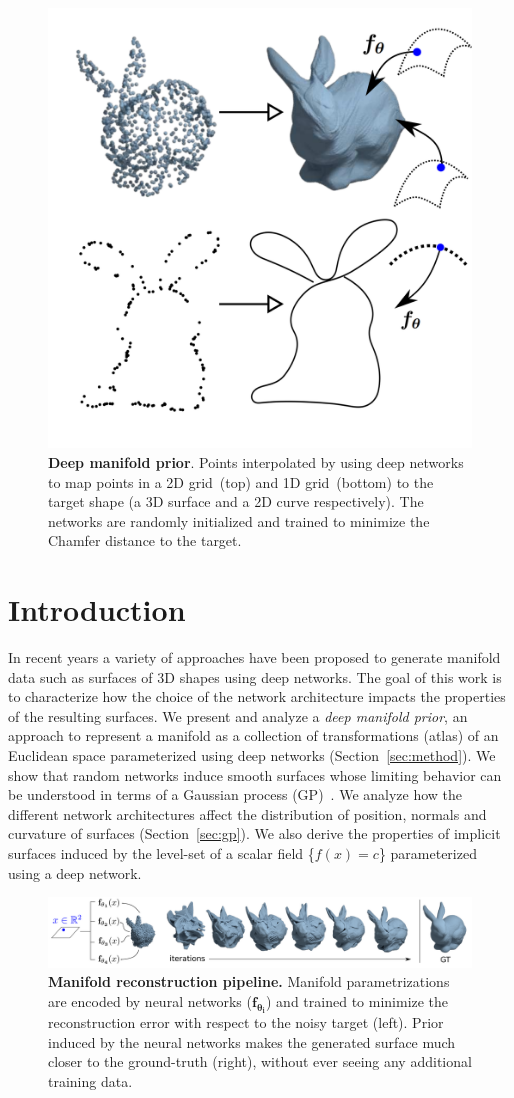 \begin{figure}
\centering
\includegraphics[width=0.5\linewidth]{dmp/imgs/visabstract.pdf}
\caption{\label{fig:visabstract}\small
\textbf{Deep manifold prior}. Points interpolated by using deep networks to map points in a 2D grid~(top) and 1D grid~(bottom) to the target shape (a 3D surface and a 2D curve respectively). The networks are randomly initialized and trained to minimize the Chamfer distance to the target.}
\end{figure}

\section{Introduction}

In recent years a variety of approaches have been proposed to generate manifold data such
as surfaces of 3D shapes using deep networks.
The goal of this work is to characterize how the choice of the network architecture
impacts the properties of the resulting surfaces.
We present and analyze a \emph{deep manifold prior}, an approach to represent a
manifold as a collection of transformations (atlas) of an
Euclidean space parameterized using deep networks (Section~\ref{sec:method}).
We show that random networks induce smooth surfaces whose limiting
behavior can be understood in terms of a Gaussian process
(GP)~\cite{Neal,williams1997computing, cho2009kernel}.
We analyze how the different network architectures affect the
distribution of position, normals and
curvature of surfaces (Section~\ref{sec:gp}).
We also derive the properties of implicit surfaces 
induced by the level-set of a scalar field \{$f(x) = c$\} parameterized
using a deep network.


\begin{figure}[ht]
\centering
\includegraphics[width=\linewidth]{dmp/imgs/iters.png}
    \caption{\label{fig:pipeline} \small \textbf{Manifold reconstruction pipeline.}
    Manifold parametrizations are encoded by neural networks ($\mathbf{f_{\theta_i}}$)
    and trained to minimize the reconstruction error with respect to the noisy target
    (left).
    Prior induced by the neural networks makes the generated surface much closer to
    the ground-truth (right), without ever seeing any additional training data.
}
\end{figure}

